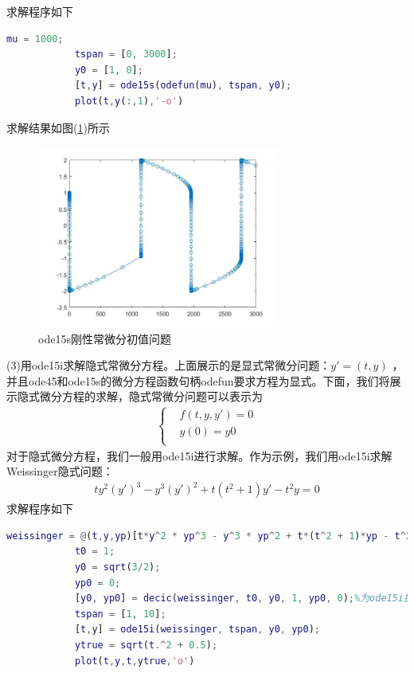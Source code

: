 	        求解程序如下
	        \begin{lstlisting}[language = Matlab]
			mu = 1000;
			tspan = [0, 3000];
			y0 = [1, 0];
			[t,y] = ode15s(odefun(mu), tspan, y0);
			plot(t,y(:,1),'-o')
	        \end{lstlisting}
	        求解结果如图(\ref{ode15s刚性常微分初值问题})所示
			\begin{figure}[H]
	        \centering
	        \includegraphics[width=8cm]{images/ode15sgangxing.jpg}
	        \caption{ode15s刚性常微分初值问题}
	        \label{ode15s刚性常微分初值问题}
	        \end{figure}
	        (3)用ode15i求解隐式常微分方程。上面展示的是显式常微分问题：$y'=(t,y)$ ，并且ode45和ode15s的微分方程函数句柄odefun要求方程为显式。下面，我们将展示隐式微分方程的求解，隐式常微分问题可以表示为
	        \begin{align*}
	        \left\{
	        \begin{aligned}
	        & f(t,y,y')=0\\
			& y(0)=y0\\
	        \end{aligned}
	        \right.
	        \end{align*}
	        对于隐式微分方程，我们一般用ode15i进行求解。作为示例，我们用ode15i求解Weissinger隐式问题：
	        \begin{align*}
	        ty^2(y')^3-y^3(y')^2+t(t^2+1)y'-t^2y=0
	        \end{align*}
	        求解程序如下
	        \begin{lstlisting}[language = Matlab]
			weissinger = @(t,y,yp)[t*y^2 * yp^3 - y^3 * yp^2 + t*(t^2 + 1)*yp - t^2 * y];
			t0 = 1;
			y0 = sqrt(3/2);
			yp0 = 0;
			[y0, yp0] = decic(weissinger, t0, y0, 1, yp0, 0);%为ode15i提供恰当的初始值
			tspan = [1, 10];
			[t,y] = ode15i(weissinger, tspan, y0, yp0);
			ytrue = sqrt(t.^2 + 0.5);
			plot(t,y,t,ytrue,'o')
	        \end{lstlisting}

